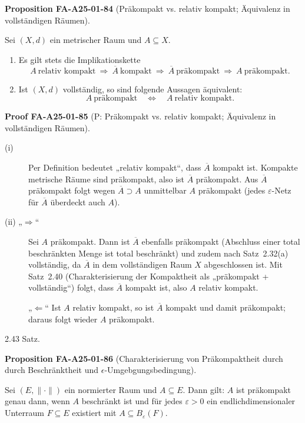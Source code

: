 \documentclass[10pt, letterpaper]{article}
\newcommand{\CustomHeading}[3]{%
  \par\medskip\noindent%
  \textbf{#1 #2} \textnormal{(#3)}.\enskip%
}
\newenvironment{PROP}[2]{\begin{unitbox}\CustomHeading{Proposition}{#1}{#2}}{\end{unitbox}}
\newenvironment{PROOF}[2]{\begin{unitbox}\CustomHeading{Proof}{#1}{#2}}{\end{unitbox}}
\begin{document}
\begin{PROP}{FA-A25-01-84}{Präkompakt vs. relativ kompakt; Äquivalenz in vollständigen Räumen}
Sei $(X,d)$ ein metrischer Raum und $A\subseteq X$.
\begin{enumerate}
\item[(i)] Es gilt stets die Implikationskette
\[
A\ \text{relativ kompakt}
\ \Longrightarrow\ 
\overline{A}\ \text{kompakt}
\ \Longrightarrow\
\overline{A}\ \text{präkompakt}
\ \Longrightarrow\
A\ \text{präkompakt}.
\]
\item[(ii)] Ist $(X,d)$ vollständig, so sind folgende Aussagen äquivalent:
\[
A\ \text{präkompakt}
\quad\Longleftrightarrow\quad
A\ \text{relativ kompakt}.
\]
\end{enumerate}
\end{PROP}


\begin{PROOF}{FA-A25-01-85}{P: Präkompakt vs. relativ kompakt; Äquivalenz in vollständigen Räumen}
\begin{description}
\item[(i)] Per Definition bedeutet „relativ kompakt“, dass $\overline{A}$ kompakt ist. Kompakte metrische Räume sind präkompakt, also ist $\overline{A}$ präkompakt. Aus $\overline{A}$ präkompakt folgt wegen $\overline{A}\supset A$ unmittelbar $A$ präkompakt (jedes $\varepsilon$-Netz für $\overline{A}$ überdeckt auch $A$).

\item[(ii) „$\Rightarrow$“] Sei $A$ präkompakt. Dann ist $\overline{A}$ ebenfalls präkompakt (Abschluss einer total beschränkten Menge ist total beschränkt) und zudem nach Satz~2.32(a) vollständig, da $\overline{A}$ in dem vollständigen Raum $X$ abgeschlossen ist. Mit Satz~2.40 (Charakterisierung der Kompaktheit als „präkompakt + vollständig“) folgt, dass $\overline{A}$ kompakt ist, also $A$ relativ kompakt.

\smallskip
\noindent „$\Leftarrow$“ Ist $A$ relativ kompakt, so ist $\overline{A}$ kompakt und damit präkompakt; daraus folgt wieder $A$ präkompakt. 
\end{description}
\end{PROOF}


2.43 Satz. 


\begin{PROP}{FA-A25-01-86}{Charakterisierung von Präkompaktheit durch durch Beschränktheit und $\epsilon$-Umgebgungsbedingung}
Sei $(E,\|\cdot\|)$ ein normierter Raum und $A \subseteq E$. Dann gilt: $A$ ist präkompakt genau dann, wenn $A$ beschränkt ist und für jedes $\varepsilon>0$ ein endlichdimensionaler Unterraum $F \subseteq E$ existiert mit $A \subseteq B_{\varepsilon}(F)$.
\end{PROP}
\end{document}
